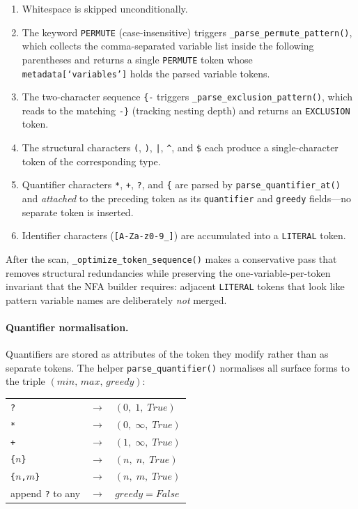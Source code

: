 \begin{enumerate}
  \item Whitespace is skipped unconditionally.
  \item The keyword \texttt{PERMUTE} (case-insensitive) triggers
    \texttt{\_parse\_permute\_pattern()}, which collects the
    comma-separated variable list inside the following parentheses
    and returns a single \texttt{PERMUTE} token whose
    \texttt{metadata[`variables']} holds the parsed variable tokens.
  \item The two-character sequence \texttt{\{-} triggers
    \texttt{\_parse\_exclusion\_pattern()}, which reads to the
    matching \texttt{-\}} (tracking nesting depth) and returns an
    \texttt{EXCLUSION} token.
  \item The structural characters \texttt{(}, \texttt{)},
    \texttt{|}, \texttt{\^{}}, and \texttt{\$} each produce a
    single-character token of the corresponding type.
  \item Quantifier characters \texttt{*}, \texttt{+}, \texttt{?},
    and \texttt{\{} are parsed by \texttt{parse\_quantifier\_at()}
    and \emph{attached} to the preceding token as its
    \texttt{quantifier} and \texttt{greedy} fields—no separate
    token is inserted.
  \item Identifier characters (\texttt{[A-Za-z0-9\_]}) are
    accumulated into a \texttt{LITERAL} token.
\end{enumerate}

After the scan, \texttt{\_optimize\_token\_sequence()} makes a
conservative pass that removes structural redundancies while
preserving the one-variable-per-token invariant that the NFA builder
requires: adjacent \texttt{LITERAL} tokens that look like pattern
variable names are deliberately \emph{not} merged.

\paragraph{Quantifier normalisation.}
Quantifiers are stored as attributes of the token they modify rather
than as separate tokens.  The helper \texttt{parse\_quantifier()}
normalises all surface forms to the triple
$(\textit{min},\,\textit{max},\,\textit{greedy})$:
\begin{center}
\begin{tabular}{lll}
  \texttt{?} & $\to$ & $(0,\;1,\;\mathit{True})$ \\
  \texttt{*} & $\to$ & $(0,\;\infty,\;\mathit{True})$ \\
  \texttt{+} & $\to$ & $(1,\;\infty,\;\mathit{True})$ \\
  \texttt{\{$n$\}} & $\to$ & $(n,\;n,\;\mathit{True})$ \\
  \texttt{\{$n$,$m$\}} & $\to$ & $(n,\;m,\;\mathit{True})$ \\
  append \texttt{?} to any & $\to$ & $\mathit{greedy} = \mathit{False}$
\end{tabular}
\end{center}

